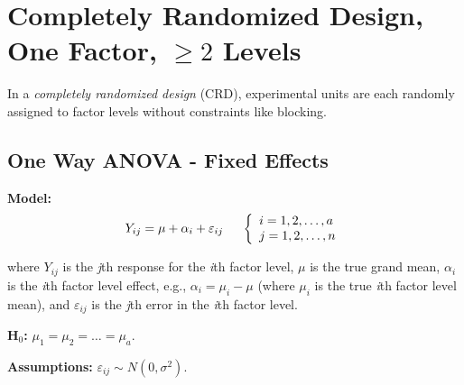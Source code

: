 \documentclass[12pt,english]{article}\usepackage[]{graphicx}\usepackage[table]{xcolor}
\begin{document}
\section{Completely Randomized Design, One Factor, $\geq 2$ Levels}
In a \textit{completely randomized design} (CRD), experimental units are each randomly assigned to factor levels without constraints like blocking.

\subsection{One Way ANOVA - Fixed Effects}

\textbf{Model:} \[Y_{ij} = \mu + \alpha_i + \varepsilon_{ij} \hspace{0.2in} \left\{
                \begin{array}{ll}
                  i = 1,2,\dots,a\\
                  j = 1,2,\dots,n\\
                  \end{array}
              \right.\]



\noindent where $Y_{ij}$ is the \textit{j}th response for the \textit{i}th factor level, $\mu$ is the true grand mean, $\alpha_i$ is the \textit{i}th factor level effect, e.g., $\alpha_i = \mu_i - \mu$ (where $\mu_i$ is the true \textit{i}th factor level mean), and $\varepsilon_{ij}$ is the \textit{j}th error in the \textit{i}th factor level. \\
\vspace{0.05in}

\noindent \textbf{H$_0$:} $\mu_1 = \mu_2 = \dots = \mu_a$.

\vspace{0.1in}
\noindent \textbf{Assumptions:} $\varepsilon_{ij} \sim N(0, \sigma^2)$.
\vspace{0.1in}
\end{document}
